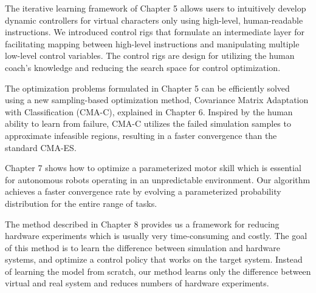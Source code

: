 The iterative learning framework of Chapter 5 allows users to intuitively
develop dynamic controllers for virtual characters only using high-level,
human-readable instructions.
We introduced control rigs that
formulate an intermediate layer 
for facilitating mapping between high-level instructions and manipulating
multiple low-level control variables.
The control rigs are design for utilizing the human coach's knowledge and 
reducing the search space for control optimization.

The optimization problems formulated in Chapter 5 can be efficiently solved
using a new sampling-based optimization method, Covariance Matrix
Adaptation with Classification (CMA-C), explained in Chapter 6.
Inspired by the human ability to learn from failure,
CMA-C utilizes the failed simulation samples to approximate infeasible regions,
resulting in a faster convergence than the standard CMA-ES.

Chapter 7 shows how to optimize a parameterized motor skill which
is essential for autonomous robots operating in an unpredictable environment.
Our algorithm achieves a faster convergence rate by evolving a parameterized
probability distribution for the entire range of tasks.

The method described in Chapter 8 provides us a framework for reducing hardware
experiments which is usually very time-consuming and costly.
The goal of this method is to learn the difference between simulation and
hardware systems, and optimize a control policy that works on the target system.
Instead of learning the model from scratch, our method learns only the
difference between virtual and real system and reduces
numbers of hardware experiments.



